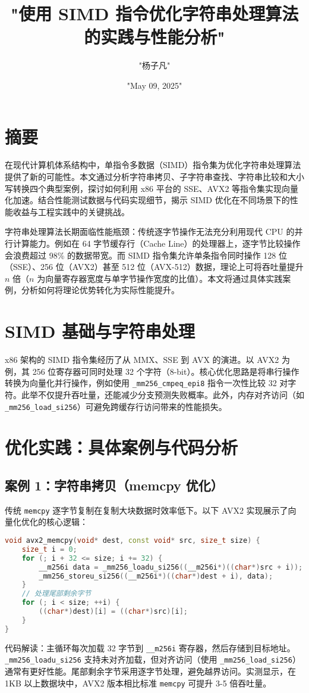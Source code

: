 \title{"使用 SIMD 指令优化字符串处理算法的实践与性能分析"}
\author{"杨子凡"}
\date{"May 09, 2025"}
\maketitle
\chapter{摘要}
在现代计算机体系结构中，单指令多数据（SIMD）指令集为优化字符串处理算法提供了新的可能性。本文通过分析字符串拷贝、子字符串查找、字符串比较和大小写转换四个典型案例，探讨如何利用 x86 平台的 SSE、AVX2 等指令集实现向量化加速。结合性能测试数据与代码实现细节，揭示 SIMD 优化在不同场景下的性能收益与工程实践中的关键挑战。\par
字符串处理算法长期面临性能瓶颈：传统逐字节操作无法充分利用现代 CPU 的并行计算能力。例如在 64 字节缓存行（Cache Line）的处理器上，逐字节比较操作会浪费超过 98\%{} 的数据带宽。而 SIMD 指令集允许单条指令同时操作 128 位（SSE）、256 位（AVX2）甚至 512 位（AVX-512）数据，理论上可将吞吐量提升 $n$ 倍（$n$ 为向量寄存器宽度与单字节操作宽度的比值）。本文将通过具体实践案例，分析如何将理论优势转化为实际性能提升。\par
\chapter{SIMD 基础与字符串处理}
x86 架构的 SIMD 指令集经历了从 MMX、SSE 到 AVX 的演进。以 AVX2 为例，其 256 位寄存器可同时处理 32 个字符（8-bit）。核心优化思路是将串行操作转换为向量化并行操作，例如使用 \verb!_mm256_cmpeq_epi8! 指令一次性比较 32 对字符。此举不仅提升吞吐量，还能减少分支预测失败概率。此外，内存对齐访问（如 \verb!_mm256_load_si256!）可避免跨缓存行访问带来的性能损失。\par
\chapter{优化实践：具体案例与代码分析}
\section{案例 1：字符串拷贝（memcpy 优化）}
传统 \verb!memcpy! 逐字节复制在复制大块数据时效率低下。以下 AVX2 实现展示了向量化优化的核心逻辑：\par
\begin{lstlisting}[language=cpp]
void avx2_memcpy(void* dest, const void* src, size_t size) {
    size_t i = 0;
    for (; i + 32 <= size; i += 32) {
        __m256i data = _mm256_loadu_si256((__m256i*)((char*)src + i));
        _mm256_storeu_si256((__m256i*)((char*)dest + i), data);
    }
    // 处理尾部剩余字节
    for (; i < size; ++i) {
        ((char*)dest)[i] = ((char*)src)[i];
    }
}
\end{lstlisting}
代码解读：主循环每次加载 32 字节到 \verb!__m256i! 寄存器，然后存储到目标地址。\verb!_mm256_loadu_si256! 支持未对齐加载，但对齐访问（使用 \verb!_mm256_load_si256!）通常有更好性能。尾部剩余字节采用逐字节处理，避免越界访问。实测显示，在 1KB 以上数据块中，AVX2 版本相比标准 \verb!memcpy! 可提升 3-5 倍吞吐量。\par
